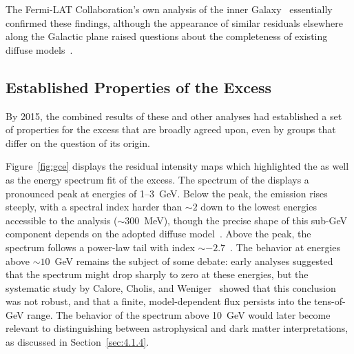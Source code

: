 The Fermi-LAT Collaboration's own analysis of the inner Galaxy~\cite{Fermi-LAT:2015sau} essentially confirmed these findings, although the appearance of similar residuals elsewhere along the Galactic plane raised questions about the completeness of existing diffuse models~\cite{Calore:2014xka}.

\subsection{Established Properties of the Excess}
\label{sec:4.1.3}

By 2015, the combined results of these and other analyses had established a set of properties for the excess that are broadly agreed upon, even by groups that differ on the question of its origin.

Figure~\ref{fig:gce} displays the residual intensity maps which highlighted the \GCE as well as the energy spectrum fit of the excess.
The spectrum of the \GCE displays a pronounced peak at energies of 1--3~GeV.
Below the peak, the emission rises steeply, with a spectral index harder than $\sim 2$ down to the lowest energies accessible to the analysis ($\sim 300$~MeV), though the precise shape of this sub-GeV component depends on the adopted diffuse model~\cite{Calore:2014xka}.
Above the peak, the spectrum follows a power-law tail with index $\sim -2.7$~\cite{Calore:2014xka,Daylan:2014rsa}.
The behavior at energies above $\sim 10$~GeV remains the subject of some debate: early analyses suggested that the spectrum might drop sharply to zero at these energies, but the systematic study by Calore, Cholis, and Weniger~\cite{Calore:2014xka} showed that this conclusion was not robust, and that a finite, model-dependent flux persists into the tens-of-GeV range.
The behavior of the spectrum above 10~GeV would later become relevant to distinguishing between astrophysical and dark matter interpretations, as discussed in Section~\ref{sec:4.1.4}.

